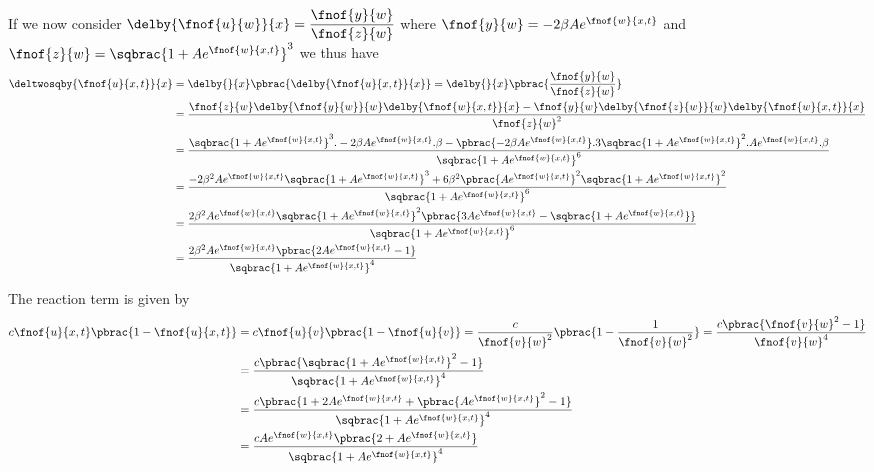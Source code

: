 If we now consider
$\delby{\fnof{u}{w}}{x}=\dfrac{\fnof{y}{w}}{\fnof{z}{w}}$ where
$\fnof{y}{w}=-2\beta A e^{\fnof{w}{x,t}}$ and
$\fnof{z}{w}=\sqbrac{1+A e^{\fnof{w}{x,t}}}^{3}$ we thus have
\begin{align}
  \deltwosqby{\fnof{u}{x,t}}{x}&=\delby{}{x}\pbrac{\delby{\fnof{u}{x,t}}{x}}=\delby{}{x}\pbrac{\dfrac{\fnof{y}{w}}{\fnof{z}{w}}}\\
  &=\dfrac{\fnof{z}{w}\delby{\fnof{y}{w}}{w}\delby{\fnof{w}{x,t}}{x}-
    \fnof{y}{w}\delby{\fnof{z}{w}}{w}\delby{\fnof{w}{x,t}}{x}}{\fnof{z}{w}^{2}} \\
  &=\dfrac{\sqbrac{1+A e^{\fnof{w}{x,t}}}^{3}.-2\beta A e^{\fnof{w}{x,t}}.\beta-
    \pbrac{-2\beta A e^{\fnof{w}{x,t}}}.3\sqbrac{1+A e^{\fnof{w}{x,t}}}^{2}.A e^{\fnof{w}{x,t}}.\beta}{\sqbrac{1+A e^{\fnof{w}{x,t}}}^{6}} \\
  &=\dfrac{-2\beta^{2}A e^{\fnof{w}{x,t}}\sqbrac{1+A e^{\fnof{w}{x,t}}}^{3}+
    6\beta^{2}\pbrac{A e^{\fnof{w}{x,t}}}^{2}\sqbrac{1+A e^{\fnof{w}{x,t}}}^{2}}{\sqbrac{1+A e^{\fnof{w}{x,t}}}^{6}}\\
  &=\dfrac{2\beta^{2}A e^{\fnof{w}{x,t}}\sqbrac{1+A e^{\fnof{w}{x,t}}}^{2}\pbrac{3A e^{\fnof{w}{x,t}}-
      \sqbrac{1+A e^{\fnof{w}{x,t}}}}}{\sqbrac{1+A e^{\fnof{w}{x,t}}}^{6}} \\
  &=\dfrac{2\beta^{2}A e^{\fnof{w}{x,t}}\pbrac{2A e^{\fnof{w}{x,t}}-1}}{\sqbrac{1+A e^{\fnof{w}{x,t}}}^{4}}
\end{align}

The reaction term is given by
\begin{align}
  c\fnof{u}{x,t}\pbrac{1-\fnof{u}{x,t}}&=c\fnof{u}{v}\pbrac{1-\fnof{u}{v}}=
  \dfrac{c}{\fnof{v}{w}^{2}}\pbrac{1-\dfrac{1}{\fnof{v}{w}^{2}}}=\dfrac{c\pbrac{\fnof{v}{w}^{2}-1}}{\fnof{v}{w}^{4}}\\
  &=\dfrac{c\pbrac{\sqbrac{1+A e^{\fnof{w}{x,t}}}^{2}-1}}{\sqbrac{1+A e^{\fnof{w}{x,t}}}^{4}}\\
  &=\dfrac{c\pbrac{1+2A e^{\fnof{w}{x,t}}+\pbrac{A e^{\fnof{w}{x,t}}}^{2}-1}}{\sqbrac{1+A e^{\fnof{w}{x,t}}}^{4}}\\
  &=\dfrac{cA e^{\fnof{w}{x,t}}\pbrac{2+A e^{\fnof{w}{x,t}}}}{\sqbrac{1+A e^{\fnof{w}{x,t}}}^{4}}
\end{align}


